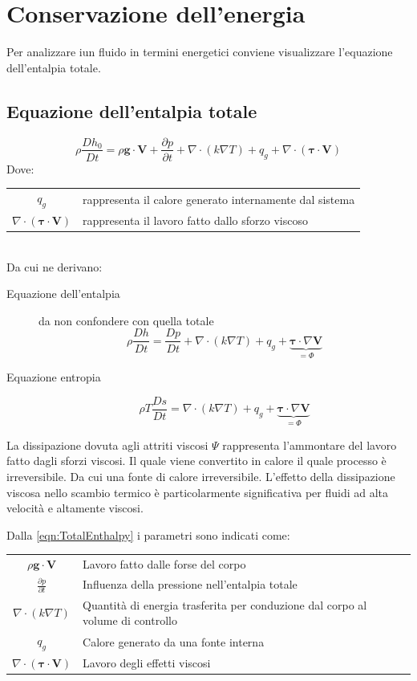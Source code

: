 \section{Conservazione dell'energia}
Per analizzare iun fluido in termini energetici conviene visualizzare l'equazione dell'entalpia totale.

\subsection{Equazione dell'entalpia totale}
\begin{equation}
\rho \frac{Dh_0}{Dt} = \rho \mathbf{g} \cdot \mathbf{V} + \frac{\partial p}{\partial t} + \nabla \cdot (k \nabla T) + q_g + \nabla \cdot (\boldsymbol{\tau} \cdot \mathbf{V})
\label{eqn:TotalEnthalpy}
\end{equation}
Dove:\\
\begin{tabular}{cl}
$q_g$ & rappresenta il calore generato internamente dal sistema\\
$\nabla \cdot (\boldsymbol{\tau} \cdot \mathbf{V})$ & rappresenta il lavoro fatto dallo sforzo viscoso
\end{tabular}\\
Da cui ne derivano:
\begin{description}
\item[Equazione dell'entalpia] da non confondere con quella totale
\begin{equation}
\rho \frac{Dh}{Dt} = \frac{Dp}{Dt} + \nabla \cdot (k \nabla T) + q_g + \underbrace{\boldsymbol{\tau} \cdot \nabla \mathbf{V}}_{= \Phi}
\end{equation}
\item[Equazione entropia]
\begin{equation}
\rho T \frac{Ds}{Dt} = \nabla \cdot (k \nabla T) + q_g + \underbrace{\boldsymbol{\tau} \cdot \nabla \mathbf{V}}_{= \Phi}
\end{equation}
\end{description}
La dissipazione dovuta agli attriti viscosi $\Psi$ rappresenta l'ammontare del lavoro fatto dagli sforzi viscosi. Il quale viene convertito in calore il quale processo è irreversibile. Da cui una fonte di calore irreversibile.
L'effetto della dissipazione viscosa nello scambio termico è particolarmente significativa per fluidi ad alta velocità e altamente viscosi. 

Dalla \eqref{eqn:TotalEnthalpy} i parametri sono indicati come:\\
\begin{tabular}{cp{}}
$\rho \mathbf{g} \cdot \mathbf{V}$ & Lavoro fatto dalle forse del corpo\\
$\frac{\partial p}{\partial t}$ & Influenza della pressione nell'entalpia totale\\
$\nabla \cdot (k\nabla T)$ & Quantità di energia trasferita per conduzione dal corpo al volume di controllo\\
$q_g$ & Calore generato da una fonte interna\\
$\nabla \cdot (\boldsymbol{\tau} \cdot \mathbf{V})$ & Lavoro degli effetti viscosi 
\end{tabular}

